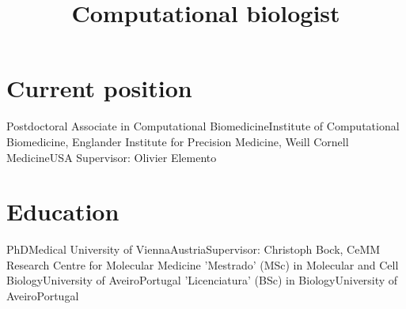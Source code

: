 \documentclass[11pt,a4paper,roman]{moderncv} %
\title{Computational biologist}
\begin{document}
\makecvtitle %


\section{Current position}
    {Postdoctoral Associate in Computational Biomedicine}{Institute of Computational Biomedicine, Englander Institute for Precision Medicine, Weill Cornell Medicine}{USA}
    {}{Supervisor: Olivier Elemento}


\section{Education}
        {PhD}{Medical University of Vienna}{Austria}{}{Supervisor: Christoph Bock, CeMM Research Centre for Molecular Medicine}
        {'Mestrado' (MSc) in Molecular and Cell Biology}{University of Aveiro}{Portugal}{}{}
        {'Licenciatura' (BSc) in Biology}{University of Aveiro}{Portugal}{}{}


\end{document}

